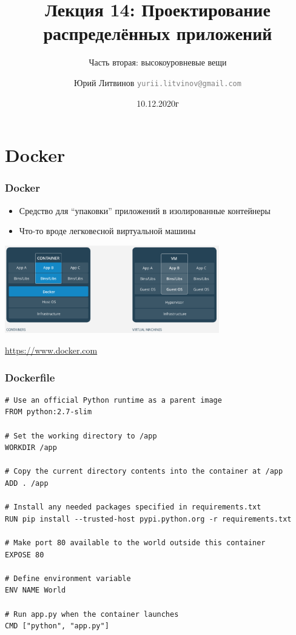 \documentclass[xetex,mathserif,serif]{beamer}
\title{Лекция 14: Проектирование распределённых приложений}
\subtitle{Часть вторая: высокоуровневые вещи}
\author[Юрий Литвинов]{Юрий Литвинов \newline \textcolor{gray}{\small\texttt{yurii.litvinov@gmail.com}}}
\date{10.12.2020г}
\newcommand{\attribution}[1] {
	\begin{flushright}\begin{scriptsize}\textcolor{gray}{\textcopyright\; #1}\end{scriptsize}\end{flushright}
}
\begin{document}
	
	\frame{\titlepage}

	\section{Docker}

	\begin{frame}
		\frametitle{Docker}
		\begin{itemize}
			\item Средство для ``упаковки'' приложений в изолированные контейнеры
			\item Что-то вроде легковесной виртуальной машины
		\end{itemize}
		\begin{center}
			\includegraphics[width=0.7\textwidth]{docker.png}
			\attribution{\url{https://www.docker.com}}
		\end{center}
	\end{frame}
	
	\begin{frame}[fragile]
		\frametitle{Dockerfile}
		\begin{scriptsize}
			\begin{verbatim}
# Use an official Python runtime as a parent image
FROM python:2.7-slim

# Set the working directory to /app
WORKDIR /app

# Copy the current directory contents into the container at /app
ADD . /app

# Install any needed packages specified in requirements.txt
RUN pip install --trusted-host pypi.python.org -r requirements.txt

# Make port 80 available to the world outside this container
EXPOSE 80

# Define environment variable
ENV NAME World

# Run app.py when the container launches
CMD ["python", "app.py"]
			\end{verbatim}
		\end{scriptsize}
	\end{frame}
\end{document}
